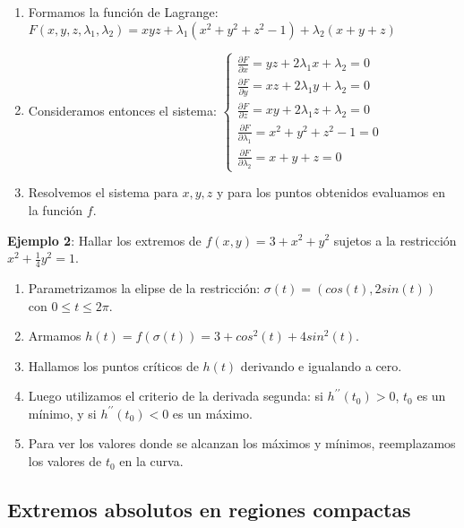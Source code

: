 \documentclass[a4paper, twoside]{article}
\numberwithin{equation}{section}
\numberwithin{figure}{section}
\numberwithin{table}{section}
\begin{document}
					\begin{enumerate}
						\item Formamos la función de Lagrange: $F(x,y,z,\lambda_1,\lambda_2)=xyz+\lambda_1 (x^2+y^2+z^2-1)+\lambda_2(x+y+z)$
						\item Consideramos entonces el sistema:
					$\begin{cases}
					\frac{\partial F}{\partial x}=yz+2\lambda_1 x+\lambda_2=0\\
					\frac{\partial F}{\partial y}=xz+2\lambda_1 y+\lambda_2=0\\
					\frac{\partial F}{\partial z}=xy+2\lambda_1 z+\lambda_2=0\\
					\frac{\partial F}{\partial\lambda_1}=x^2+y^2+z^2-1=0\\
					\frac{\partial F}{\partial\lambda_2}=x+y+z=0\end{cases}$
					
						\item Resolvemos el sistema para $x,y,z$ y para los puntos obtenidos evaluamos en la función $f$.
					\end{enumerate}
					
					\textbf{Ejemplo 2}: Hallar los extremos de $f(x,y)=3+x^2+y^2$ sujetos a la restricción $x^2+\frac{1}{4}y^2=1$.\\
					
					\begin{enumerate}
						\item Parametrizamos la elipse de la restricción: $\sigma(t)=(cos(t),2sin(t))$ con $0\le t\le2\pi$.
						\item Armamos $h(t)=f(\sigma(t))=3+cos^2(t)+4sin^2(t)$.
						\item Hallamos los puntos críticos de $h(t)$ derivando e igualando a cero.
						\item Luego utilizamos el criterio de la derivada segunda: si $h^{\prime\prime} (t_0)>0$, $t_0$ es un mínimo, y si $h^{\prime\prime}(t_0)<0$ es un máximo.
						\item Para ver los valores donde se alcanzan los máximos y mínimos, reemplazamos los valores de $t_0$ en la curva.\\					
					\end{enumerate}				
				\subsection{Extremos absolutos en regiones compactas}
				
\end{document}
